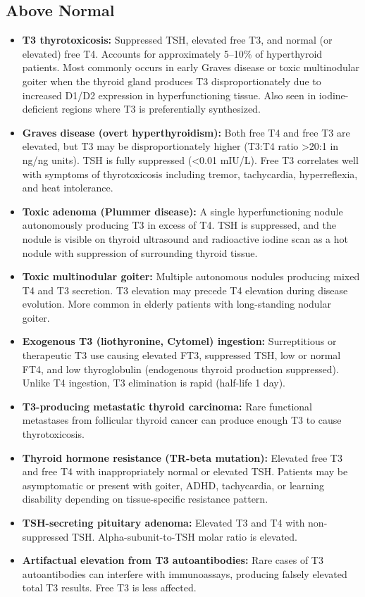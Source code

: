 \subsection*{Above Normal}
\begin{itemize}
  \item \textbf{T3 thyrotoxicosis:} Suppressed TSH, elevated free T3, and normal (or elevated) free T4. Accounts for approximately 5--10\% of hyperthyroid patients. Most commonly occurs in early Graves disease or toxic multinodular goiter when the thyroid gland produces T3 disproportionately due to increased D1/D2 expression in hyperfunctioning tissue. Also seen in iodine-deficient regions where T3 is preferentially synthesized.
  \item \textbf{Graves disease (overt hyperthyroidism):} Both free T4 and free T3 are elevated, but T3 may be disproportionately higher (T3:T4 ratio >20:1 in ng/ng units). TSH is fully suppressed (<0.01 mIU/L). Free T3 correlates well with symptoms of thyrotoxicosis including tremor, tachycardia, hyperreflexia, and heat intolerance.
  \item \textbf{Toxic adenoma (Plummer disease):} A single hyperfunctioning nodule autonomously producing T3 in excess of T4. TSH is suppressed, and the nodule is visible on thyroid ultrasound and radioactive iodine scan as a hot nodule with suppression of surrounding thyroid tissue.
  \item \textbf{Toxic multinodular goiter:} Multiple autonomous nodules producing mixed T4 and T3 secretion. T3 elevation may precede T4 elevation during disease evolution. More common in elderly patients with long-standing nodular goiter.
  \item \textbf{Exogenous T3 (liothyronine, Cytomel) ingestion:} Surreptitious or therapeutic T3 use causing elevated FT3, suppressed TSH, low or normal FT4, and low thyroglobulin (endogenous thyroid production suppressed). Unlike T4 ingestion, T3 elimination is rapid (half-life 1 day).
  \item \textbf{T3-producing metastatic thyroid carcinoma:} Rare functional metastases from follicular thyroid cancer can produce enough T3 to cause thyrotoxicosis.
  \item \textbf{Thyroid hormone resistance (TR-beta mutation):} Elevated free T3 and free T4 with inappropriately normal or elevated TSH. Patients may be asymptomatic or present with goiter, ADHD, tachycardia, or learning disability depending on tissue-specific resistance pattern.
  \item \textbf{TSH-secreting pituitary adenoma:} Elevated T3 and T4 with non-suppressed TSH. Alpha-subunit-to-TSH molar ratio is elevated.
  \item \textbf{Artifactual elevation from T3 autoantibodies:} Rare cases of T3 autoantibodies can interfere with immunoassays, producing falsely elevated total T3 results. Free T3 is less affected.
\end{itemize}

